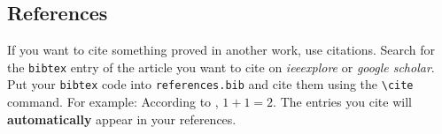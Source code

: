 \documentclass[conference]{IEEEtran}
\begin{document}
%
%
%


%
%

\subsection{References}

If you want to cite something proved in another work, use citations.
Search for the \texttt{bibtex} entry of the article you want to cite on \textit{ieeexplore} or \textit{google scholar}.
Put your \texttt{bibtex} code into \texttt{references.bib} and cite them using the \verb|\cite| command.
For example: According to \cite{akyildiz2002survey}, $1 + 1 = 2$.
The entries you cite will \textbf{automatically} appear in your references.
\end{document}
